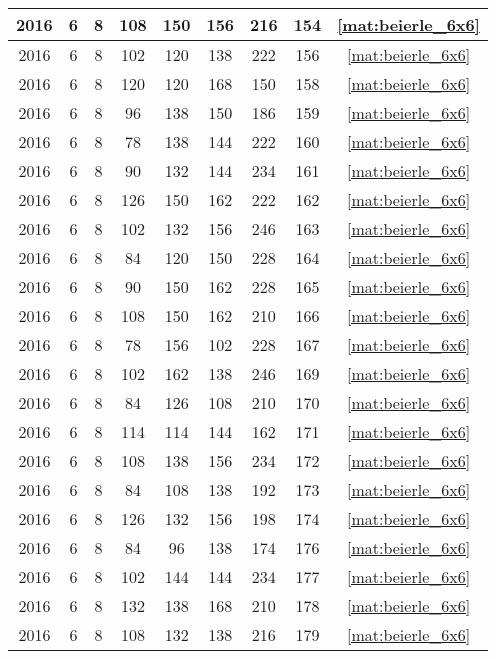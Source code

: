 \begin{longtable}{|c|c|c|c|c|c|c|c|c|}
2016 & 6 & 8 & 108 & 150 & 156 & 216 & 154 & \eqref{mat:beierle_6x6} \\ \hline 
2016 & 6 & 8 & 102 & 120 & 138 & 222 & 156 & \eqref{mat:beierle_6x6} \\ \hline 
2016 & 6 & 8 & 120 & 120 & 168 & 150 & 158 & \eqref{mat:beierle_6x6} \\ \hline 
2016 & 6 & 8 & 96 & 138 & 150 & 186 & 159 & \eqref{mat:beierle_6x6} \\ \hline 
2016 & 6 & 8 & 78 & 138 & 144 & 222 & 160 & \eqref{mat:beierle_6x6} \\ \hline 
2016 & 6 & 8 & 90 & 132 & 144 & 234 & 161 & \eqref{mat:beierle_6x6} \\ \hline 
2016 & 6 & 8 & 126 & 150 & 162 & 222 & 162 & \eqref{mat:beierle_6x6} \\ \hline 
2016 & 6 & 8 & 102 & 132 & 156 & 246 & 163 & \eqref{mat:beierle_6x6} \\ \hline 
2016 & 6 & 8 & 84 & 120 & 150 & 228 & 164 & \eqref{mat:beierle_6x6} \\ \hline 
2016 & 6 & 8 & 90 & 150 & 162 & 228 & 165 & \eqref{mat:beierle_6x6} \\ \hline 
2016 & 6 & 8 & 108 & 150 & 162 & 210 & 166 & \eqref{mat:beierle_6x6} \\ \hline 
2016 & 6 & 8 & 78 & 156 & 102 & 228 & 167 & \eqref{mat:beierle_6x6} \\ \hline 
2016 & 6 & 8 & 102 & 162 & 138 & 246 & 169 & \eqref{mat:beierle_6x6} \\ \hline 
2016 & 6 & 8 & 84 & 126 & 108 & 210 & 170 & \eqref{mat:beierle_6x6} \\ \hline 
2016 & 6 & 8 & 114 & 114 & 144 & 162 & 171 & \eqref{mat:beierle_6x6} \\ \hline 
2016 & 6 & 8 & 108 & 138 & 156 & 234 & 172 & \eqref{mat:beierle_6x6} \\ \hline 
2016 & 6 & 8 & 84 & 108 & 138 & 192 & 173 & \eqref{mat:beierle_6x6} \\ \hline 
2016 & 6 & 8 & 126 & 132 & 156 & 198 & 174 & \eqref{mat:beierle_6x6} \\ \hline 
2016 & 6 & 8 & 84 & 96 & 138 & 174 & 176 & \eqref{mat:beierle_6x6} \\ \hline 
2016 & 6 & 8 & 102 & 144 & 144 & 234 & 177 & \eqref{mat:beierle_6x6} \\ \hline 
2016 & 6 & 8 & 132 & 138 & 168 & 210 & 178 & \eqref{mat:beierle_6x6} \\ \hline 
2016 & 6 & 8 & 108 & 132 & 138 & 216 & 179 & \eqref{mat:beierle_6x6} \\ \hline 

\end{longtable}
